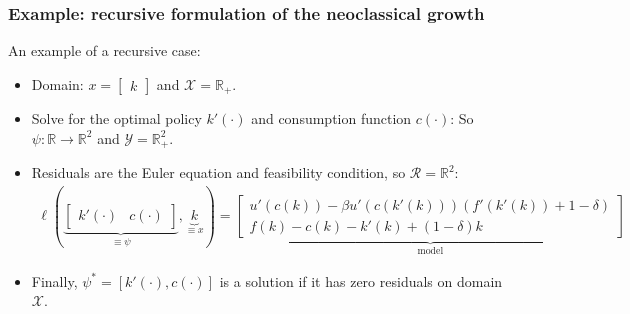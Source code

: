 \documentclass[aspectratio=169,10pt]{beamer}
\newcommand{\R}{\ensuremath{\mathbb{R}}}
\newcommand{\Xdom}{\mathcal{X}}
\newcommand{\Yrange}{\mathcal{Y}}
\newcommand{\Resid}{\mathcal{R}}
\begin{document}
\begin{frame}
	\frametitle{Example: recursive formulation of the neoclassical growth}
	An example of a recursive case:
	\begin{itemize}
		\item Domain: $x = \begin{bmatrix*}
			k
		\end{bmatrix*}
		$ and $\Xdom = \R_+$.\vspace{0.1in}
		\item Solve for the optimal policy $k'(\cdot)$ and consumption function $c(\cdot)$: So $\psi : \R \to \R^2$ and $\Yrange = \R^2_+$.\vspace{0.1in}
		\item  Residuals are the Euler equation and feasibility condition, so $\Resid = \R^2$:
		\begin{align*}
			\ell(\underbrace{\begin{bmatrix*}k'(\cdot) & c(\cdot)\end{bmatrix*}}_{\equiv \psi}, \underbrace{k}_{\equiv x}) =
			\underbrace{\begin{bmatrix*}
					u'(c(k)) - \beta u'(c(k'(k)))\left(f'(k'(k)) + 1-\delta\right) \\
					f(k) - c(k) - k'(k) + (1-\delta)k
			\end{bmatrix*}}_{\text{model}}
		\end{align*}
		\item Finally,  $\psi^* = \left[k'(\cdot),c(\cdot)\right]$ is a solution if it has zero residuals on domain $\Xdom$.
	\end{itemize}
	
\end{frame}
\end{document}
